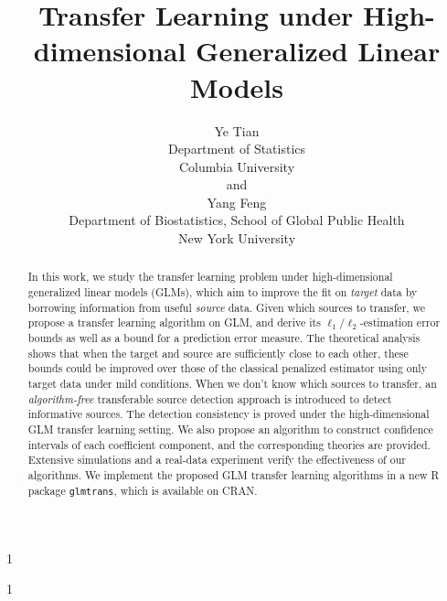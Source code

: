 \documentclass[12pt]{article}
\newcommand{\blind}{1}
\newcommand{\<}{\langle}
\renewcommand{\>}{\rangle}
\begin{document}
%

\def\spacingset#1{\renewcommand{\baselinestretch}%
{#1}\small\normalsize} \spacingset{1}


 \title{\bf Transfer Learning under High-dimensional Generalized Linear Models}
  \date{}
\blind
{
 
  \author{Ye Tian\\
    Department of Statistics\\ Columbia University\\
    and \\
    Yang Feng \\
    Department of Biostatistics, School of Global Public Health\\New York University}
   
  \maketitle
} \fi

\blind
{
  \bigskip
  \bigskip
  \bigskip

  \maketitle
} \fi

\bigskip
\begin{abstract}
	In this work, we study the transfer learning problem under high-dimensional generalized linear models (GLMs), which aim to improve the fit on \textit{target} data by borrowing information from useful \textit{source} data. Given which sources to transfer, we propose a transfer learning algorithm on GLM, and derive its $\ell_1/\ell_2$-estimation error bounds as well as a bound for a prediction error measure. The theoretical analysis shows that when the target and source are sufficiently close to each other, these bounds could be improved over those of the classical penalized estimator using only target data under mild conditions. When we don't know which sources to transfer, an \textit{algorithm-free} transferable source detection approach is introduced to detect informative sources. The detection consistency is proved under the high-dimensional GLM transfer learning setting. We also propose an algorithm to construct confidence intervals of each coefficient component, and the corresponding theories are provided. Extensive simulations and a real-data experiment verify the effectiveness of our algorithms. We implement the proposed GLM transfer learning algorithms in a new R package \texttt{glmtrans}, which is available on CRAN.
\end{abstract}
\end{document}
